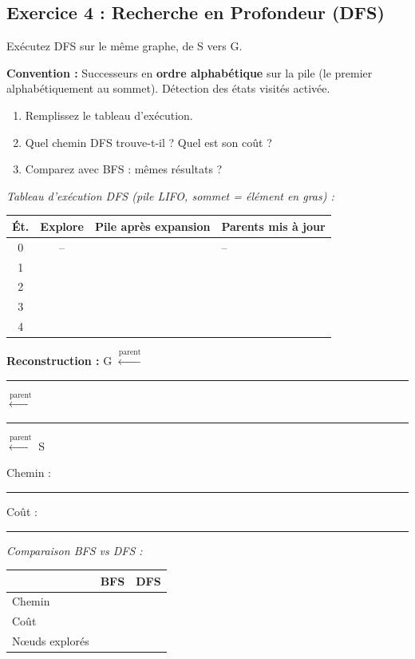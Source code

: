 \documentclass[11pt,a4paper]{article}
\begin{document}
\newpage

\subsection*{Exercice 4 : Recherche en Profondeur (DFS)}

\begin{exercicebox}[Énoncé]
Exécutez DFS sur le même graphe, de S vers G.

\textbf{Convention :} Successeurs en \textbf{ordre alphabétique} sur la pile (le premier alphabétiquement au sommet). Détection des états visités activée.

\begin{enumerate}
    \item Remplissez le tableau d'exécution.
    \item Quel chemin DFS trouve-t-il ? Quel est son coût ?
    \item Comparez avec BFS : mêmes résultats ?
\end{enumerate}
\end{exercicebox}

\noindent\textit{Tableau d'exécution DFS (pile LIFO, sommet = élément en gras) :}

{\small
\begin{center}
\renewcommand{\arraystretch}{2.0}
\begin{tabular}{|c|c|l|l|}
\hline
\textbf{Ét.} & \textbf{Explore} & \textbf{Pile après expansion} & \textbf{Parents mis à jour} \\
\hline
0 & -- & & -- \\
\hline
1 & & & \\
\hline
2 & & & \\
\hline
3 & & & \\
\hline
4 & & & \\
\hline
\end{tabular}
\end{center}
}

\noindent \textbf{Reconstruction :} G $\xleftarrow{\text{parent}}$ \rule{1cm}{0.4pt} $\xleftarrow{\text{parent}}$ \rule{1cm}{0.4pt} $\xleftarrow{\text{parent}}$ S

\noindent Chemin : \rule{5cm}{0.4pt} \quad Coût : \rule{2cm}{0.4pt}

\vspace{0.3cm}
\noindent\textit{Comparaison BFS vs DFS :}

\begin{center}
\renewcommand{\arraystretch}{1.8}
\begin{tabular}{|l|c|c|}
\hline
& \textbf{BFS} & \textbf{DFS} \\
\hline
Chemin & \hspace{3cm} & \hspace{3cm} \\
\hline
Coût & & \\
\hline
Nœuds explorés & & \\
\hline
\end{tabular}
\end{center}
\end{document}
